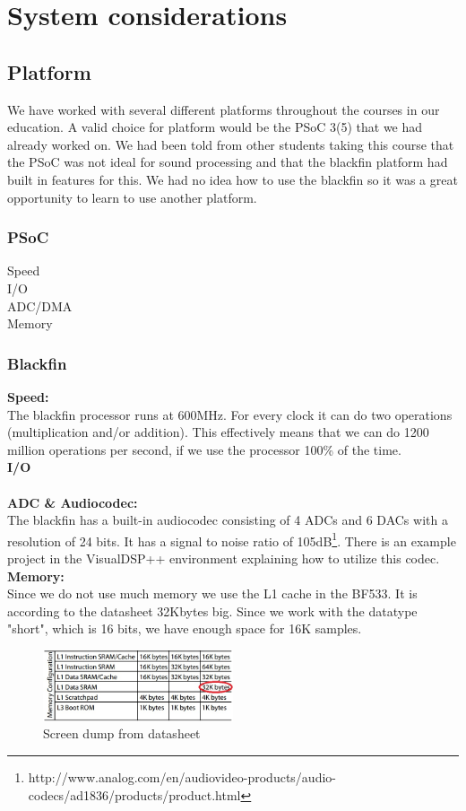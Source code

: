 \chapter{System considerations}
\section{Platform}
We have worked with several different platforms throughout the courses in our education. A valid choice for platform would be the PSoC 3(5) that we had already worked on. We had been told from other students taking this course that the PSoC was not ideal for sound processing and that the blackfin platform had built in features for this. We had no idea how to use the blackfin so it was a great opportunity to learn to use another platform. 
\subsection{PSoC}
Speed\\
I/O\\
ADC/DMA\\
Memory\\
\subsection{Blackfin}
\textbf{Speed:}\\
The blackfin processor runs at 600MHz. For every clock it can do two operations (multiplication and/or addition). This effectively means that we can do 1200 million operations per second, if we use the processor 100\% of the time.\\
\textbf{I/O}\\
\\
\textbf{ADC \& Audiocodec:}\\
The blackfin has a built-in audiocodec consisting of 4 ADCs and 6 DACs with a resolution of 24 bits. It has a signal to noise ratio of 105dB\footnote{http://www.analog.com/en/audiovideo-products/audio-codecs/ad1836/products/product.html}. There is an example project in the VisualDSP++ environment explaining how to utilize this codec.\\
\textbf{Memory:}\\
Since we do not use much memory we use the L1 cache in the BF533. It is according to the datasheet 32Kbytes big. Since we work with the datatype "short", which is 16 bits, we have enough space for 16K samples.\\
\begin{figure}[hbpt]
\centering
\includegraphics[width=0.5\textwidth]{billeder/memorytable}
\caption[Screen dump from datasheet]{Screen dump from datasheet\footnotemark}
\label{img:mem_table}
\end{figure}
